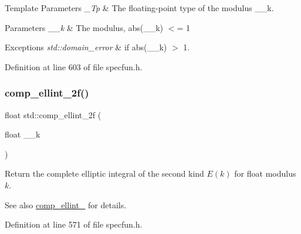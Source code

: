 \begin{DoxyTemplParams}{Template Parameters}
{\em \+\_\+\+Tp} & The floating-\/point type of the modulus {\ttfamily \+\_\+\+\_\+k}. \\
\hline
\end{DoxyTemplParams}

\begin{DoxyParams}{Parameters}
{\em \+\_\+\+\_\+k} & The modulus, {\ttfamily abs(\+\_\+\+\_\+k)} $<$= 1 \\
\hline
\end{DoxyParams}

\begin{DoxyExceptions}{Exceptions}
{\em std\+::domain\+\_\+error} & if {\ttfamily abs(\+\_\+\+\_\+k)} $>$ 1. \\
\hline
\end{DoxyExceptions}


Definition at line 603 of file specfun.\+h.

\mbox{\label{group__tr29124__math__spec__func_ga21700f2f125c42b1f1da1f9c7eea1135}} 
\subsubsection{\texorpdfstring{comp\+\_\+ellint\+\_\+2f()}{comp\_ellint\_2f()}}
{\footnotesize\ttfamily float std\+::comp\+\_\+ellint\+\_\+2f (\begin{DoxyParamCaption}\item[{float}]{\+\_\+\+\_\+k }\end{DoxyParamCaption})\hspace{0.3cm}{\ttfamily [inline]}}

Return the complete elliptic integral of the second kind $ E(k) $ for {\ttfamily float} modulus $ k $.

\begin{DoxySeeAlso}{See also}
\hyperlink{group__tr29124__math__spec__func_gacd0057c6937200dc296c98d7e53f5112}{comp\+\_\+ellint\+\_} for details. 
\end{DoxySeeAlso}


Definition at line 571 of file specfun.\+h.

